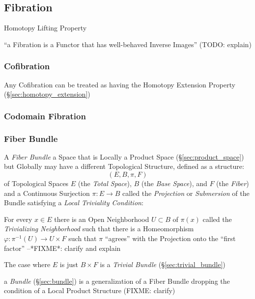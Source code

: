 \subsection{Fibration}\label{sec:fibration}

Homotopy Lifting Property

``a Fibration is a Functor that has well-behaved Inverse Images'' (TODO:
explain)



\subsubsection{Cofibration}\label{sec:cofibration}

Any Cofibration can be treated as having the Homotopy Extension
Property (\S\ref{sec:homotopy_extension})



\subsubsection{Codomain Fibration}\label{sec:codomain_fibration}

\subsubsection{Fiber Bundle}\label{sec:fiber_bundle}

A \emph{Fiber Bundle} a Space that is Locally a Product Space
(\S\ref{sec:product_space}) but Globally may have a different Topological
Structure, defined as a structure:
\[
  (E, B, \pi, F)
\]
of Topological Spaces $E$ (the \emph{Total Space}), $B$ (the \emph{Base
  Space}), and $F$ (the \emph{Fiber}) and a Continuous Surjection $\pi : E
\rightarrow B$ called the \emph{Projection} or \emph{Submersion} of the Bundle
satisfying a \emph{Local Triviality Condition}:

For every $x \in E$ there is an Open Neighborhood $U \subset B$ of $\pi(x)$
called the \emph{Trivializing Neighborhood} such that there is a Homeomorphism
$\varphi : \pi^{-1}(U) \rightarrow U \times F$ such that $\pi$ ``agrees'' with
the Projection onto the ``first factor'' --*FIXME*: clarify and explain

The case where $E$ is just $B \times F$ is a \emph{Trivial Bundle}
(\S\ref{sec:trivial_bundle})

\fist a \emph{Bundle} (\S\ref{sec:bundle}) is a generalization of a Fiber Bundle
dropping the condition of a Local Product Structure (FIXME: clarify)

